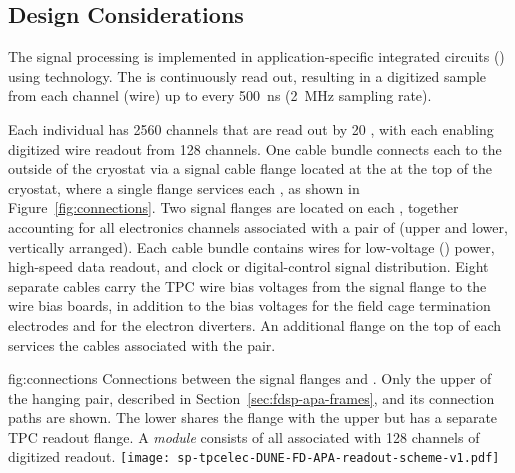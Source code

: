 \subsection{Design Considerations}
\label{sec:fdsp-tpcelec-overview-design}


The  signal processing is implemented in application-specific integrated circuits ()
using  technology.  The  is continuously read out, resulting in a digitized 
sample from each  channel (wire) up to every \SI{500}{ns} (\SI{2}{MHz} sampling rate).

Each individual  has \num{2560} channels that are read out by \num{20} , with
each  enabling digitized wire readout from \num{128} channels.  One cable bundle connects each  to
the outside of the cryostat via a  signal cable flange located at the  \fdth at the
top of the cryostat, where a single flange services each , as shown in Figure~\ref{fig:connections}.  Two  signal flanges are located on each \fdth, together accounting for all electronics channels associated with a pair of  (upper and lower, vertically arranged).
Each cable bundle contains wires for low-voltage () power, high-speed data readout, and
clock or digital-control signal distribution.  Eight separate cables carry the TPC wire bias voltages
from the signal flange to the  wire bias boards, in addition to the bias voltages for the field
cage termination electrodes and for the electron diverters.  An additional flange on the top of each \fdth services the  cables associated with the  pair.

\begin{dunefigure}
{fig:connections}
{Connections between the signal flanges and . Only the upper  of the hanging  pair, described in Section~\ref{sec:fdsp-apa-frames}, and its connection paths are shown. The lower  shares the  flange with the upper  but has a separate TPC readout flange. A \textit{ module} consists of all  associated with \num{128} channels of digitized readout.}
\texttt{[image: sp-tpcelec-DUNE-FD-APA-readout-scheme-v1.pdf]}
\end{dunefigure}

